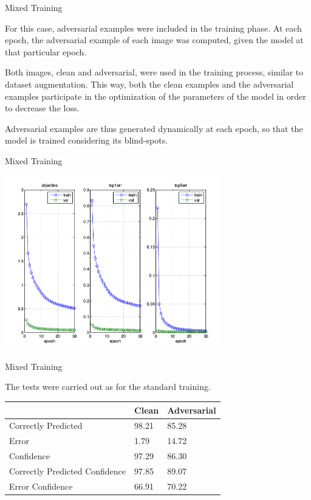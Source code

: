 \begin{tframe}{Mixed Training}

For this case, adversarial examples were included in the training phase. At each epoch, the adversarial example of each image was computed, given the model at that particular epoch. 

\vspace{0.1in}

Both images, clean and adversarial, were used in the training process, similar to dataset augmentation. This way, both the clean examples and the adversarial examples participate in the optimization of the parameters of the model in order to decrease the loss.

\vspace{0.1in}

Adversarial examples are thus generated dynamically at each epoch, so that the model is trained considering its blind-spots.

\end{tframe}

\begin{tframe}{Mixed Training}

\begin{center}
  \includegraphics[width=0.7\textwidth]{img/train-mix.png}
	\label{train-mix} 
\end{center}

\end{tframe}

\begin{tframe}{Mixed Training}

The tests were carried out as for the standard training.

\begin{table}[h]
\centering
\begin{tabular}{@{}lll@{}}
\toprule
                               & Clean & Adversarial \\ \midrule
Correctly Predicted            & 98.21 & 85.28       \\
Error                          & 1.79  & 14.72       \\
Confidence                     & 97.29 & 86.30       \\
Correctly Predicted Confidence & 97.85 & 89.07       \\
Error Confidence               & 66.91 & 70.22       \\ \bottomrule
\end{tabular}
\end{table}

\end{tframe}